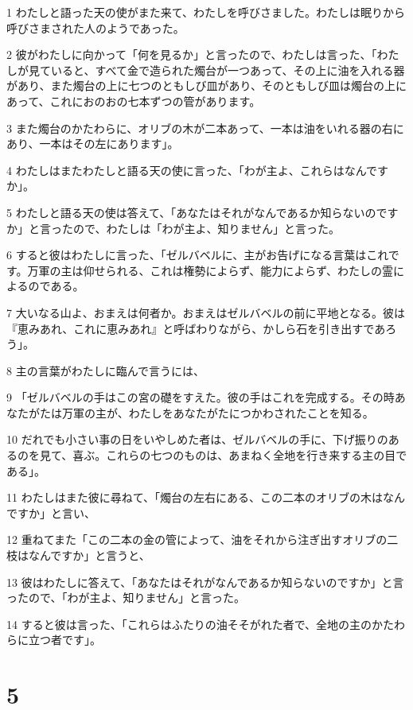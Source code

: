 \par 1 わたしと語った天の使がまた来て、わたしを呼びさました。わたしは眠りから呼びさまされた人のようであった。
\par 2 彼がわたしに向かって「何を見るか」と言ったので、わたしは言った、「わたしが見ていると、すべて金で造られた燭台が一つあって、その上に油を入れる器があり、また燭台の上に七つのともしび皿があり、そのともしび皿は燭台の上にあって、これにおのおの七本ずつの管があります。
\par 3 また燭台のかたわらに、オリブの木が二本あって、一本は油をいれる器の右にあり、一本はその左にあります」。
\par 4 わたしはまたわたしと語る天の使に言った、「わが主よ、これらはなんですか」。
\par 5 わたしと語る天の使は答えて、「あなたはそれがなんであるか知らないのですか」と言ったので、わたしは「わが主よ、知りません」と言った。
\par 6 すると彼はわたしに言った、「ゼルバベルに、主がお告げになる言葉はこれです。万軍の主は仰せられる、これは権勢によらず、能力によらず、わたしの霊によるのである。
\par 7 大いなる山よ、おまえは何者か。おまえはゼルバベルの前に平地となる。彼は『恵みあれ、これに恵みあれ』と呼ばわりながら、かしら石を引き出すであろう」。
\par 8 主の言葉がわたしに臨んで言うには、
\par 9 「ゼルバベルの手はこの宮の礎をすえた。彼の手はこれを完成する。その時あなたがたは万軍の主が、わたしをあなたがたにつかわされたことを知る。
\par 10 だれでも小さい事の日をいやしめた者は、ゼルバベルの手に、下げ振りのあるのを見て、喜ぶ。これらの七つのものは、あまねく全地を行き来する主の目である」。
\par 11 わたしはまた彼に尋ねて、「燭台の左右にある、この二本のオリブの木はなんですか」と言い、
\par 12 重ねてまた「この二本の金の管によって、油をそれから注ぎ出すオリブの二枝はなんですか」と言うと、
\par 13 彼はわたしに答えて、「あなたはそれがなんであるか知らないのですか」と言ったので、「わが主よ、知りません」と言った。
\par 14 すると彼は言った、「これらはふたりの油そそがれた者で、全地の主のかたわらに立つ者です」。

\chapter{5}

